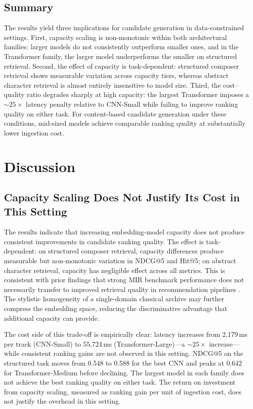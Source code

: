 \documentclass[sigconf]{acmart}
\begin{document}
\subsection{Summary}

The results yield three implications for candidate generation in data-constrained settings. First, capacity scaling is non-monotonic within both architectural families: larger models do not consistently outperform smaller ones, and in the Transformer family, the larger model underperforms the smaller on structured retrieval. Second, the effect of capacity is task-dependent: structured composer retrieval shows measurable variation across capacity tiers, whereas abstract character retrieval is almost entirely insensitive to model size. Third, the cost--quality ratio degrades sharply at high capacity: the largest Transformer imposes a ${\sim}25{\times}$ latency penalty relative to CNN-Small while failing to improve ranking quality on either task. For content-based candidate generation under these conditions, mid-sized models achieve comparable ranking quality at substantially lower ingestion cost.

\section{Discussion}

\subsection{Capacity Scaling Does Not Justify Its Cost in This Setting}

The results indicate that increasing embedding-model capacity does not produce consistent improvements in candidate ranking quality. The effect is task-dependent: on structured composer retrieval, capacity differences produce measurable but non-monotonic variation in NDCG@5 and Hit@5; on abstract character retrieval, capacity has negligible effect across all metrics. This is consistent with prior findings that strong MIR benchmark performance does not necessarily transfer to improved retrieval quality in recommendation pipelines \cite{tamm2024}. The stylistic homogeneity of a single-domain classical archive may further compress the embedding space, reducing the discriminative advantage that additional capacity can provide.

The cost side of this trade-off is empirically clear: latency increases from 2{,}179\,ms per track (CNN-Small) to 55{,}724\,ms (Transformer-Large)---a ${\sim}25{\times}$ increase---while consistent ranking gains are not observed in this setting. NDCG@5 on the structured task moves from 0.548 to 0.588 for the best CNN and peaks at 0.642 for Transformer-Medium before declining. The largest model in each family does not achieve the best ranking quality on either task. The return on investment from capacity scaling, measured as ranking gain per unit of ingestion cost, does not justify the overhead in this setting.
\end{document}
